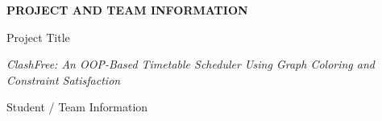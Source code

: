 \documentclass[11pt,a4paper]{article}
\newcommand{\blueheading}[1]{%
    {\sffamily\color{TitleBlue}\fontsize{15}{18}\selectfont #1}%
}
\newcommand{\bluebigheading}[1]{%
    {\sffamily\bfseries\color{TitleBlue}\fontsize{16}{19}\selectfont #1}%
}
\newcommand{\answerbox}[2][]{%
    \vspace{2pt}\par
    \noindent
    {\itshape #2}\par
    \vspace{2pt}
}
\begin{document}
\vspace*{4mm}

\bluebigheading{PROJECT AND TEAM INFORMATION}

\vspace{8mm}

\blueheading{Project Title}

\vspace{1mm}

\answerbox{ClashFree: An OOP-Based Timetable Scheduler Using Graph Coloring and Constraint Satisfaction}

\vspace{8mm}

\blueheading{Student / Team Information}

\vspace{2mm}

\noindent
\end{document}

